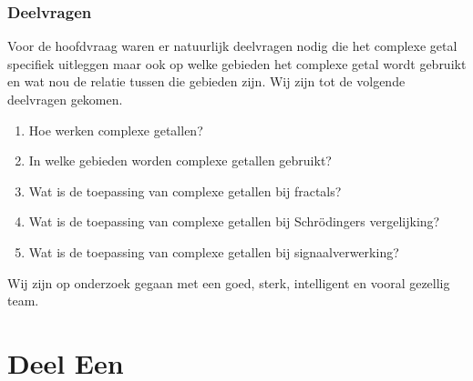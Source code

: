 \documentclass[11pt,fleqn]{book} %
\begin{document}
\section{Deelvragen}
Voor de hoofdvraag waren er natuurlijk deelvragen nodig die het complexe getal specifiek uitleggen maar ook op welke gebieden het complexe getal wordt gebruikt en wat nou de relatie tussen die gebieden zijn. Wij zijn tot de volgende deelvragen gekomen.
\begin{enumerate}
\item Hoe werken complexe getallen?
\item In welke gebieden worden complexe getallen gebruikt?
\item Wat is de toepassing van complexe getallen bij fractals?
\item Wat is de toepassing van complexe getallen bij Schrödingers vergelijking?
\item Wat is de toepassing van complexe getallen bij signaalverwerking? 
\end{enumerate}

Wij zijn op onderzoek gegaan met een goed, sterk, intelligent en vooral gezellig team.



\pagestyle{empty} %

\tableofcontents %

\cleardoublepage %

\pagestyle{fancy} %


\part{Deel Een}

\end{document}
